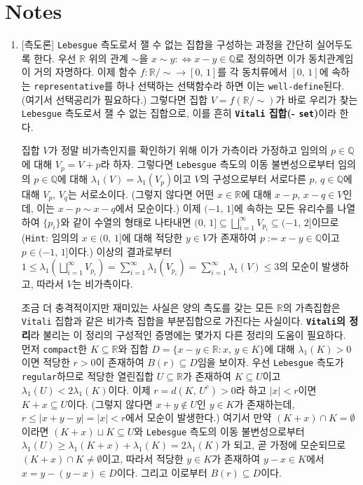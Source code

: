 \section*{Notes}
\footnotesize
\begin{enumerate}[label = \textsf{\textbf{\arabic*}}]
    \item \textsf{[측도론]} \texttt{Lebesgue} 측도로서 잴 수 없는 집합을 구성하는 과정을 간단히 실어두도록 한다. 우선 $\mathbb{R}$ 위의 관계 $\sim$을 $x\sim y:\Leftrightarrow x-y\in\mathbb{Q}$로 정의하면 이가 동치관계임이 거의 자명하다. 이제 함수 $f:\mathbb{R}/\sim\to[0,\,1]$를 각 동치류에서 $[0,\,1]$에 속하는 \texttt{representative}를 하나 선택하는 선택함수라 하면 이는 \texttt{well-define}된다. (여기서 선택공리가 필요하다.) 그렇다면 집합 $V=f(\mathbb{R}/\sim)$가 바로 우리가 찾는 \texttt{Lebesgue} 측도로서 잴 수 없는 집합으로, 이를 흔히 \textbf{\texttt{Vitali} 집합(- \texttt{set})}이라 한다.

    집합 $V$가 정말 비가측인지를 확인하기 위해 이가 가측이라 가정하고 임의의 $p\in\mathbb{Q}$에 대해 $V_p=V+p$라 하자. 그렇다면 \texttt{Lebesgue} 측도의 이동 불변성으로부터 임의의 $p\in\mathbb{Q}$에 대해 $\lambda_1(V)=\lambda_1(V_p)$이고 $V$의 구성으로부터 서로다른 $p,\,q\in\mathbb{Q}$에 대해 $V_p,\,V_q$는 서로소이다. (그렇지 않다면 어떤 $x\in\mathbb{R}$에 대해 $x-p,\,x-q\in V$인데, 이는 $x-p\sim x-q$에서 모순이다.) 이제 $(-1,\,1]$에 속하는 모든 유리수를 나열하여 $\{p_i\}$와 같이 수열의 형태로 나타내면 $(0,\,1]\subseteq\bigsqcup_{i=1}^\infty V_{p_i}\subseteq(-1,\,2]$이므로(\texttt{Hint}: 임의의 $x\in (0,\,1]$에 대해 적당한 $y\in V$가 존재하여 $p:=x-y\in\mathbb{Q}$이고 $p\in(-1,\,1]$이다.) 이상의 결과로부터 $1\leq\lambda_1(\bigsqcup_{i=1}^\infty V_{p_i})=\sum_{i=1}^\infty\lambda_1(V_{p_i})=\sum_{i=1}^\infty\lambda_1(V)\leq3$의 모순이 발생하고, 따라서 $V$는 비가측이다.
    
    조금 더 충격적이지만 재미있는 사실은 양의 측도를 갖는 모든 $\mathbb{R}$의 가측집합은 \texttt{Vitali} 집합과 같은 비가측 집합을 부분집합으로 가진다는 사실이다. \textbf{\texttt{Vitali}의 정리}라 불리는 이 정리의 구성적인 증명에는 몇가지 다른 정리의 도움이 필요하다. 먼저 \texttt{compact}한 $K\subseteq\mathbb{R}$와 집합 $D=\{x-y\in\mathbb{R}:x,\,y\in K\}$에 대해 $\lambda_1(K)>0$이면 적당한 $r>0$이 존재하여 $B(r)\subseteq D$임을 보이자. 우선 \texttt{Lebesgue} 측도가 \texttt{regular}하므로 적당한 열린집합 $U\subseteq\mathbb{R}$가 존재하여 $K\subseteq U$이고 $\lambda_1(U)<2\lambda_1(K)$이다. 이제 $r=d(K,\,U^c)>0$라 하고 $|x|<r$이면 $K+x\subseteq U$이다. (그렇지 않다면 $x+y\notin U$인 $y\in K$가 존재하는데, $r\leq|x+y-y|=|x|<r$에서 모순이 발생한다.) 여기서 만약 $(K+x)\cap K=\emptyset$이라면 $(K+x)\sqcup K\subseteq U$와 \texttt{Lebesgue} 측도의 이동 불변성으로부터 $\lambda_1(U)\geq\lambda_1(K+x)+\lambda_1(K)=2\lambda_1(K)$가 되고, 곧 가정에 모순되므로 $(K+x)\cap K\ne\emptyset$이고, 따라서 적당한 $y\in K$가 존재하여 $y-x\in K$에서 $x=y-(y-x)\in D$이다. 그리고 이로부터 $B(r)\subseteq D$이다.
    

\end{enumerate}
